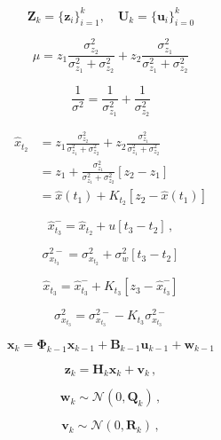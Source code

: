 \begin{equation}
  \bm{Z}_k = \{\bm{z}_i\}^k_{i = 1}, \quad \bm{U}_{k} = \{\bm{u}_i\}^k_{i = 0}
\end{equation}


\begin{equation}
  \mu=z_1\frac{\sigma^2_{z_2}}{\sigma^2_{z_1}+\sigma^2_{z_2}}+z_2\frac{\sigma^2_{z_1}}{\sigma^2_{z_1}+\sigma^2_{z_2}}
\end{equation}

\begin{equation}
  \frac{1}{\sigma^2}=\frac{1}{\sigma^2_{z_1}}+\frac{1}{\sigma^2_{z_2}}
\end{equation}


\begin{equation}
\begin{split}
  \hat{x}_{t_2} & =z_1\frac{\sigma^2_{z_2}}{\sigma^2_{z_1}+\sigma^2_{z_2}}+z_2\frac{\sigma^2_{z_1}}{\sigma^2_{z_1}+\sigma^2_{z_2}} \\
  & =z_1+\frac{\sigma^2_{z_1}}{\sigma^2_{z_1}+\sigma^2_{z_2}}[z_2-z_1] \\
  &= \hat{x}(t_1) + K_{t_2}[z_2-\hat{x}(t_1)]
\end{split}
\end{equation}

\begin{equation}
  \hat{x}^-_{t_3}=\hat{x}_{t_2}+u[t_3-t_2]\,,
\end{equation}

\begin{equation}\label{eq:variance_predicted}
  \sigma^{2-}_{x_{t_3}}=\sigma^2_{x_{t_2}}+\sigma^2_w[t_3-t_2]
\end{equation}

\begin{equation}
  \hat{x}_{t_3} = \hat{x}^-_{t_3} + K_{t_3}[z_3-\hat{x}^-_{t_3}]
\end{equation}

\begin{equation}\label{eq:variance_kalman}
  \sigma^2_{x_{t_3}} = \sigma^{2-}_{x_{t_3}}-K_{t_3}\sigma^{2-}_{x_{t_3}}
\end{equation}

\begin{equation}\label{eq:time_dynamical_system_plant}
  \bm{x}_k = \bm{\Phi}_{k-1}\bm{x}_{k-1}+\bm{B}_{k-1}\bm{u}_{k-1}+\bm{w}_{k-1}
\end{equation}

\begin{equation}\label{eq:time_dynamical_system_measurement}
  \bm{z}_k = \bm{H}_{k}\bm{x}_{k}+\bm{v}_{k}\,,
\end{equation}

\begin{equation}\label{eq:process_noise}
  \bm{w}_{k} \sim \mathcal{N}(0,\bm{Q}_k)\,,
\end{equation}

\begin{equation}\label{eq:measurement_noise}
  \bm{v}_{k} \sim \mathcal{N}(0,\bm{R}_k)\,,
\end{equation}